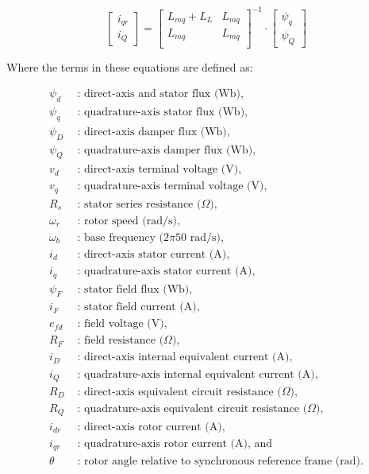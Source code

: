 \begin{equation}
    \label{eq:sync_mach_alg_2}
    \begin{bmatrix}
        i_{qr} \\
        i_Q  
    \end{bmatrix}
    =
    \begin{bmatrix}
        L_{mq} + L_{L} & L_{mq} \\
        L_{mq}         & L_{mq} \\
    \end{bmatrix}^{-1}
    \cdot
    \begin{bmatrix}
        \psi_q \\
        \psi_Q  
    \end{bmatrix}
\end{equation}

Where the terms in these equations are defined as:

\begin{align*}
    \psi_d   & \text{ : direct-axis and stator flux (Wb)}, \\
    \psi_q   & \text{ : quadrature-axis stator flux (Wb)}, \\
    \psi_D   & \text{ : direct-axis damper flux (Wb)}, \\
    \psi_Q   & \text{ : quadrature-axis damper flux (Wb)}, \\
    v_d      & \text{ : direct-axis terminal voltage (V)}, \\
    v_q      & \text{ : quadrature-axis terminal voltage (V)}, \\
    R_s      & \text{ : stator series resistance (} \Omega \text{)}, \\
    \omega_r & \text{ : rotor speed (rad/s)}, \\
    \omega_b & \text{ : base frequency (} 2 \pi 50 \text{ rad/s)}, \\
    i_d      & \text{ : direct-axis stator current (A)}, \\
    i_q      & \text{ : quadrature-axis stator current (A)}, \\
    \psi_F   & \text{ : stator field flux (Wb)}, \\
    i_F      & \text{ : stator field current (A)}, \\
    e_{fd}   & \text{ : field voltage (V)}, \\
    R_F      & \text{ : field resistance (} \Omega \text{)}, \\
    i_D      & \text{ : direct-axis internal equivalent current (A)}, \\
    i_Q      & \text{ : quadrature-axis internal equivalent current (A)}, \\
    R_D      & \text{ : direct-axis equivalent circuit resistance (} \Omega \text{)}, \\
    R_Q      & \text{ : quadrature-axis equivalent circuit resistance (} \Omega \text{)}, \\
    i_{dr}   & \text{ : direct-axis rotor current (A)}, \\
    i_{qr}   & \text{ : quadrature-axis rotor current (A), and}  \\
    \theta   & \text{ : rotor angle relative to synchronous reference frame  (rad).}
\end{align*}


